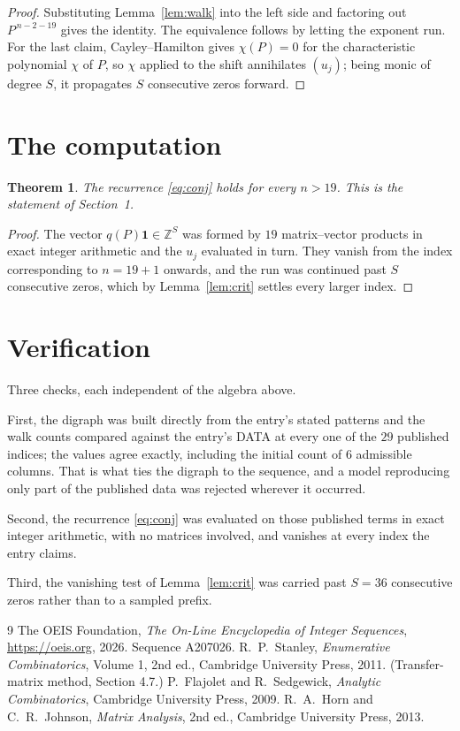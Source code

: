 \documentclass[11pt,a4paper]{article}
\theoremstyle{plain}
\newtheorem{theorem}{Theorem}
\theoremstyle{definition}
\begin{document}
\begin{proof}
Substituting Lemma~\ref{lem:walk} into the left side and factoring out
$P^{\,n-2-19}$ gives the identity. The equivalence follows by letting the exponent
run. For the last claim, Cayley--Hamilton gives $\chi(P)=0$ for the characteristic
polynomial $\chi$ of $P$, so $\chi$ applied to the shift annihilates $(u_j)$; being monic of
degree $S$, it propagates $S$ consecutive zeros forward.
\end{proof}

\section{The computation}

\begin{theorem}
The recurrence \eqref{eq:conj} holds for every $n>19$. This is the statement of
Section~1.
\end{theorem}

\begin{proof}
The vector $q(P)\mathbf{1}\in\mathbb{Z}^{S}$ was formed by $19$ matrix--vector
products in exact integer arithmetic and the $u_j$ evaluated in turn. They vanish from the
index corresponding to $n=19+1$ onwards, and the run was continued past $S$ consecutive
zeros, which by Lemma~\ref{lem:crit} settles every larger index.
\end{proof}

\section{Verification}

Three checks, each independent of the algebra above.

First, the digraph was built directly from the entry's stated patterns and the walk counts
compared against the entry's DATA at every one of the $29$ published indices; the
values agree exactly, including the initial count of $6$ admissible columns. That is
what ties the digraph to the sequence, and a model reproducing only part of the published
data was rejected wherever it occurred.

Second, the recurrence \eqref{eq:conj} was evaluated on those published terms in exact
integer arithmetic, with no matrices involved, and vanishes at every index the entry claims.

Third, the vanishing test of Lemma~\ref{lem:crit} was carried past $S=36$ consecutive
zeros rather than to a sampled prefix.

\begin{thebibliography}{9}
 The OEIS Foundation, \emph{The On-Line Encyclopedia of Integer
Sequences}, \url{https://oeis.org}, 2026. Sequence A207026.
 R.~P.~Stanley, \emph{Enumerative Combinatorics}, Volume 1, 2nd ed.,
Cambridge University Press, 2011. (Transfer-matrix method, Section 4.7.)
 P.~Flajolet and R.~Sedgewick, \emph{Analytic Combinatorics}, Cambridge
University Press, 2009.
 R.~A.~Horn and C.~R.~Johnson, \emph{Matrix Analysis}, 2nd ed., Cambridge
University Press, 2013.
\end{thebibliography}
\end{document}
